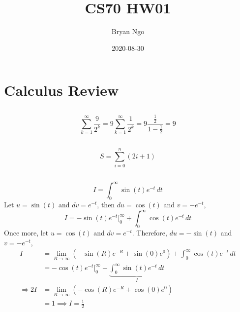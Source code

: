 \documentclass{article}
\title{CS70 HW01}
\author{Bryan Ngo}
\date{2020-08-30}
\begin{document}
\maketitle

\section{Calculus Review}

\subsection{}

\begin{equation}
    \sum_{k = 1}^\infty \frac{9}{2^k} = 9 \sum_{k = 1}^\infty \frac{1}{2^k} = 9 \frac{\frac{1}{2}}{1 - \frac{1}{2}} = 9
\end{equation}

\subsection{}

\begin{equation}
    S = \sum_{i = 0}^n (2i + 1)
\end{equation}

\subsection{}

\begin{equation}
    I = \int_0^{\infty} \sin(t) e^{-t} \, dt
\end{equation}
Let \(u = \sin(t)\) and \(dv = e^{-t}\), then \(du = \cos(t)\) and \(v = -e^{-t}\),
\begin{equation}
    I = -\sin(t) e^{-t}|_0^\infty + \int_0^\infty \cos(t) e^{-t} \, dt
\end{equation}
Once more, let \(u = \cos(t)\) and \(dv = e^{-t}\).
Therefore, \(du = -\sin(t)\) and \(v = -e^{-t}\),
\begin{align}
    I &= \lim_{R \to \infty} (-\sin(R) e^{-R} + \sin(0) e^{0}) + \int_0^\infty \cos(t) e^{-t} \, dt \\
    &= -\cos(t) e^{-t}|_0^\infty - \underbrace{\int_0^\infty \sin(t) e^{-t} \, dt}_I \\
    \Rightarrow 2I &= \lim_{R \to \infty} (-\cos(R) e^{-R} + \cos(0) e^0) \\
    &= 1 \implies I = \frac{1}{2}
\end{align}
\end{document}
